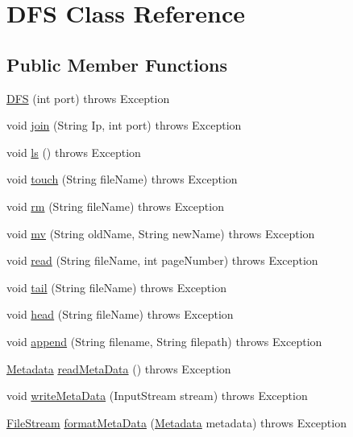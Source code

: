 \hypertarget{class_d_f_s}{}\section{D\+FS Class Reference}
\label{class_d_f_s}
\subsection*{Public Member Functions}
\begin{DoxyCompactItemize}
\item 
\hyperlink{class_d_f_s_ad863806217afcce82e64f5d7d4c124ad}{D\+FS} (int port)  throws Exception 
\item 
void \hyperlink{class_d_f_s_afb27b3ac552ee5a0b615f76157ebde81}{join} (String Ip, int port)  throws Exception 
\item 
void \hyperlink{class_d_f_s_af3c132a409c6f252fb20bae93e8ddc81}{ls} ()  throws Exception 
\item 
void \hyperlink{class_d_f_s_ac44bf8288f4423fc87370b97f95f07c1}{touch} (String file\+Name)  throws Exception 
\item 
void \hyperlink{class_d_f_s_a8e5dfe50eebc3c2131412cb35d8ec3f2}{rm} (String file\+Name)  throws Exception 
\item 
void \hyperlink{class_d_f_s_a7b0d44e11c6176a71d040919b6fe1d96}{mv} (String old\+Name, String new\+Name)  throws Exception 
\item 
void \hyperlink{class_d_f_s_a06f0b38ec2d726ec9c35b43f3e6d02e0}{read} (String file\+Name, int page\+Number)  throws Exception 
\item 
void \hyperlink{class_d_f_s_ac34aa133fcfaaf293e672b7574c599d6}{tail} (String file\+Name)  throws Exception 
\item 
void \hyperlink{class_d_f_s_a0651a87b91f3da25ea2f3fe605789d70}{head} (String file\+Name)  throws Exception 
\item 
void \hyperlink{class_d_f_s_a119519b72f38226815a4b65760701dcf}{append} (String filename, String filepath)  throws Exception 
\item 
\hyperlink{class_metadata}{Metadata} \hyperlink{class_d_f_s_a05df5c4a73e10460c29b14b46642eb8a}{read\+Meta\+Data} ()  throws Exception 
\item 
void \hyperlink{class_d_f_s_ae97c5b386f9d638a2ca9ebd79665bb25}{write\+Meta\+Data} (Input\+Stream stream)  throws Exception 
\item 
\hyperlink{class_file_stream}{File\+Stream} \hyperlink{class_d_f_s_a06f226c0d3f2e00a015c47e759d0fbc3}{format\+Meta\+Data} (\hyperlink{class_metadata}{Metadata} metadata)  throws Exception 
\end{DoxyCompactItemize}


